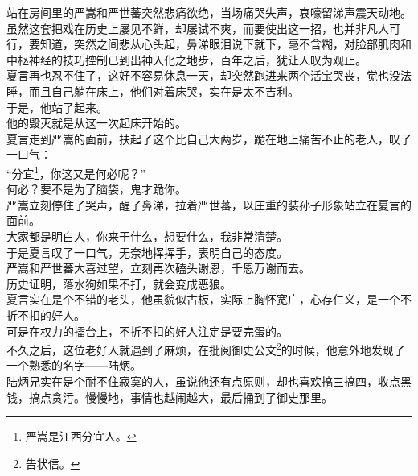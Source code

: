 \begin{multicols}{\theparacolNo}
站在房间里的严嵩和严世蕃突然悲痛欲绝，当场痛哭失声，哀嚎留涕声震天动地。\\

虽然这套把戏在历史上屡见不鲜，却屡试不爽，而要使出这一招，也并非凡人可行，要知道，突然之间悲从心头起，鼻涕眼泪说下就下，毫不含糊，对脸部肌肉和中枢神经的技巧控制已到出神入化之地步，百年之后，犹让人叹为观止。\\

夏言再也忍不住了，这好不容易休息一天，却突然跑进来两个活宝哭丧，觉也没法睡，而且自己躺在床上，他们对着床哭，实在是太不吉利。\\

于是，他站了起来。\\

他的毁灭就是从这一次起床开始的。\\

夏言走到严嵩的面前，扶起了这个比自己大两岁，跪在地上痛苦不止的老人，叹了一口气：\\

“分宜\footnote{严嵩是江西分宜人。}，你这又是何必呢？”\\

何必？要不是为了脑袋，鬼才跪你。\\

严嵩立刻停住了哭声，醒了鼻涕，拉着严世蕃，以庄重的装孙子形象站立在夏言的面前。\\

大家都是明白人，你来干什么，想要什么，我非常清楚。\\

于是夏言叹了一口气，无奈地挥挥手，表明自己的态度。\\

严嵩和严世蕃大喜过望，立刻再次磕头谢恩，千恩万谢而去。\\

历史证明，落水狗如果不打，就会变成恶狼。\\

夏言实在是个不错的老头，他虽貌似古板，实际上胸怀宽广，心存仁义，是一个不折不扣的好人。\\

可是在权力的擂台上，不折不扣的好人注定是要完蛋的。\\

不久之后，这位老好人就遇到了麻烦，在批阅御史公文\footnote{告状信。}的时候，他意外地发现了一个熟悉的名字——陆炳。\\

陆炳兄实在是个耐不住寂寞的人，虽说他还有点原则，却也喜欢搞三搞四，收点黑钱，搞点贪污。慢慢地，事情也越闹越大，最后捅到了御史那里。\\


\end{multicols}
